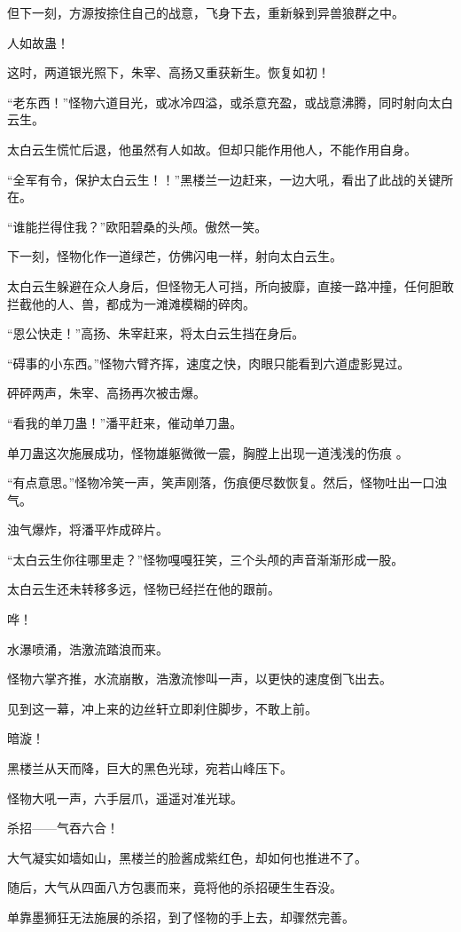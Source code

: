 \begin{this_body}
但下一刻，方源按捺住自己的战意，飞身下去，重新躲到异兽狼群之中。

人如故蛊！

这时，两道银光照下，朱宰、高扬又重获新生。恢复如初！

“老东西！”怪物六道目光，或冰冷四溢，或杀意充盈，或战意沸腾，同时射向太白云生。

太白云生慌忙后退，他虽然有人如故。但却只能作用他人，不能作用自身。

“全军有令，保护太白云生！！”黑楼兰一边赶来，一边大吼，看出了此战的关键所在。

“谁能拦得住我？”欧阳碧桑的头颅。傲然一笑。

下一刻，怪物化作一道绿芒，仿佛闪电一样，射向太白云生。

太白云生躲避在众人身后，但怪物无人可挡，所向披靡，直接一路冲撞，任何胆敢拦截他的人、兽，都成为一滩滩模糊的碎肉。

“恩公快走！”高扬、朱宰赶来，将太白云生挡在身后。

“碍事的小东西。”怪物六臂齐挥，速度之快，肉眼只能看到六道虚影晃过。

砰砰两声，朱宰、高扬再次被击爆。

“看我的单刀蛊！”潘平赶来，催动单刀蛊。

单刀蛊这次施展成功，怪物雄躯微微一震，胸膛上出现一道浅浅的伤痕 。

“有点意思。”怪物冷笑一声，笑声刚落，伤痕便尽数恢复。然后，怪物吐出一口浊气。

浊气爆炸，将潘平炸成碎片。

“太白云生你往哪里走？”怪物嘎嘎狂笑，三个头颅的声音渐渐形成一股。

太白云生还未转移多远，怪物已经拦在他的跟前。

哗！

水瀑喷涌，浩激流踏浪而来。

怪物六掌齐推，水流崩散，浩激流惨叫一声，以更快的速度倒飞出去。

见到这一幕，冲上来的边丝轩立即刹住脚步，不敢上前。

暗漩！

黑楼兰从天而降，巨大的黑色光球，宛若山峰压下。

怪物大吼一声，六手层爪，遥遥对准光球。

杀招——气吞六合！

大气凝实如墙如山，黑楼兰的脸酱成紫红色，却如何也推进不了。

随后，大气从四面八方包裹而来，竟将他的杀招硬生生吞没。

单靠墨狮狂无法施展的杀招，到了怪物的手上去，却骤然完善。


\end{this_body}
